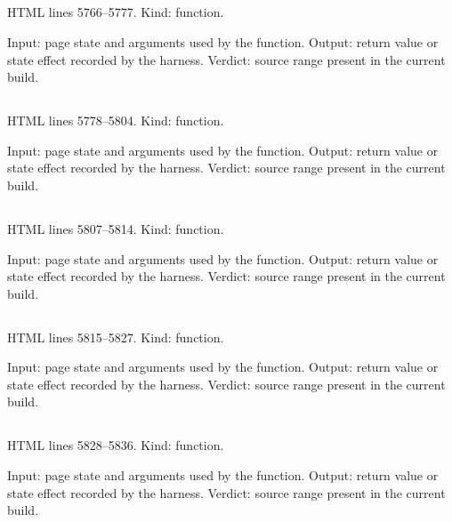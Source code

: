 \subsection*{\texttt{}}
\label{vf_262_ccTransitionPairs}
HTML lines 5766--5777. Kind: function.

Input: page state and arguments used by the function.
Output: return value or state effect recorded by the harness.
Verdict: source range present in the current build.

\subsection*{\texttt{}}
\label{vf_263_ccTransitions}
HTML lines 5778--5804. Kind: function.

Input: page state and arguments used by the function.
Output: return value or state effect recorded by the harness.
Verdict: source range present in the current build.

\subsection*{\texttt{}}
\label{vf_264_ccThin}
HTML lines 5807--5814. Kind: function.

Input: page state and arguments used by the function.
Output: return value or state effect recorded by the harness.
Verdict: source range present in the current build.

\subsection*{\texttt{}}
\label{vf_265_ccPeakRates}
HTML lines 5815--5827. Kind: function.

Input: page state and arguments used by the function.
Output: return value or state effect recorded by the harness.
Verdict: source range present in the current build.

\subsection*{\texttt{}}
\label{vf_266_ccThermalSummary}
HTML lines 5828--5836. Kind: function.

Input: page state and arguments used by the function.
Output: return value or state effect recorded by the harness.
Verdict: source range present in the current build.

